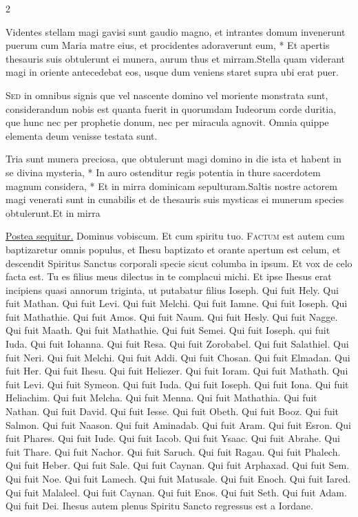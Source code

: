 \begin{multicols*}{2}
\begin{responsory}
{Videntes stellam magi gavisi sunt gaudio magno, et intrantes domum invenerunt puerum cum Maria matre eius, et procidentes adoraverunt eum, * Et apertis thesauris suis obtulerunt ei munera, aurum thus et mirram.}{Stella quam viderant magi in oriente antecedebat eos, usque dum veniens staret supra ubi erat puer.}
\end{responsory}%
\lettrine[lines=2]{\zallmancaps \color{Red} S}{ed} in omnibus signis que vel nascente domino vel moriente monstrata sunt, considerandum nobis est quanta fuerit in quorumdam Iudeorum corde duritia, que hunc nec per prophetie donum, nec per miracula agnovit. Omnia quippe elementa deum venisse testata sunt.
\begin{responsory-final}
{Tria sunt munera preciosa, que obtulerunt magi domino in die ista et habent in se divina mysteria, * In auro ostenditur regis potentia in thure sacerdotem magnum considera, * Et in mirra dominicam sepulturam.}{Saltis nostre actorem magi venerati sunt in cunabilis et de thesauris suis mysticas ei munerum species obtulerunt.}{Et in mirra}
\end{responsory-final}%
\newline \ul{Postea sequitur.} Dominus vobiscum. Et cum spiritu tuo.
\lettrine[lines=2]{\zallmancaps \color{Red} F}{actum} est autem cum baptizaretur omnis populus, et Ihesu baptizato et orante apertum est celum, et descendit Spiritus Sanctus corporali specie sicut columba in ipsum. Et vox de celo facta est. Tu es filius meus dilectus in te complacui michi. Et ipse Ihesus erat incipiens quasi annorum triginta, ut putabatur filius Ioseph. Qui fuit Hely. Qui fuit Mathan. Qui fuit Levi. Qui fuit Melchi. Qui fuit Iamne. Qui fuit Ioseph. Qui fuit Mathathie. Qui fuit Amos. Qui fuit Naum. Qui fuit Hesly. Qui fuit Nagge. Qui fuit Maath. Qui fuit Mathathie. Qui fuit Semei. Qui fuit Ioseph. qui fuit Iuda. Qui fuit Iohanna. Qui fuit Resa. Qui fuit Zorobabel. Qui fuit Salathiel. Qui fuit Neri. Qui fuit Melchi. Qui fuit Addi. Qui fuit Chosan. Qui fuit Elmadan. Qui fuit Her. Qui fuit Ihesu. Qui fuit Heliezer. Qui fuit Ioram. Qui fuit Mathath. Qui fuit Levi. Qui fuit Symeon. Qui fuit Iuda. Qui fuit Ioseph. Qui fuit Iona. Qui fuit Heliachim. Qui fuit Melcha. Qui fuit Menna. Qui fuit Mathathia. Qui fuit Nathan. Qui fuit David. Qui fuit Iesse. Qui fuit Obeth. Qui fuit Booz. Qui fuit Salmon. Qui fuit Naason. Qui fuit Aminadab. Qui fuit Aram. Qui fuit Esron. Qui fuit Phares. Qui fuit Iude. Qui fuit Iacob. Qui fuit Ysaac. Qui fuit Abrahe. Qui fuit Thare. Qui fuit Nachor. Qui fuit Saruch. Qui fuit Ragau. Qui fuit Phalech. Qui fuit Heber. Qui fuit Sale. Qui fuit Caynan. Qui fuit Arphaxad. Qui fuit Sem. Qui fuit Noe. Qui fuit Lamech. Qui fuit Matusale. Qui fuit Enoch. Qui fuit Iared. Qui fuit Malaleel. Qui fuit Caynan. Qui fuit Enos. Qui fuit Seth. Qui fuit Adam. Qui fuit Dei. Ihesus autem plenus Spiritu Sancto regressus est a Iordane.

\end{multicols*}
